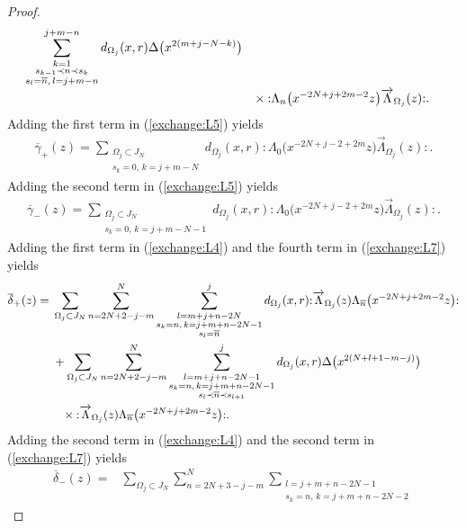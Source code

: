 \documentclass[10pt,a4paper]{amsart}
\numberwithin{equation}{section}
\begin{document}
\begin{proof}
\begin{align}
\sum\limits_{\substack{k=1\\s_{k-1}\prec n \prec s_k
\\s_l=\overline{n},\, l=j+m-n}}^{j+m-n}d_{\Omega_j}(x,r)\Delta\big(x^{2(m+j-N-k)}\big)\notag
\\[-.5ex]
&\phantom{+}\times{:}\Lambda_{n}\big(x^{-2N+j+2m-2}z\big)\overrightarrow{\Lambda}_{\Omega_j}(z){:}.
\label{def:bbeta-}
\end{align}
Adding the first term in (\ref{exchange:L5}) yields
\begin{gather}
\overline{\gamma}_+(z)=
\sum\limits_{\substack{\Omega_j \subset J_N\\s_k=0,\, k=j+m-N}}
d_{\Omega_j}(x,r){:}\Lambda_0\big(x^{-2N+j-2+2m}z\big)
\overrightarrow{\Lambda}_{\Omega_j}(z){:}.
\label{def:bgamma+}
\end{gather}
Adding the second term in (\ref{exchange:L5}) yields
\begin{gather}
\overline{\gamma}_-(z)=\sum\limits_{\substack{\Omega_j \subset J_N
\\s_k=0,\, k=j+m-N-1}}d_{\Omega_j}(x,r)
{:}\Lambda_0\big(x^{-2N+j-2+2m}z\big)\overrightarrow{\Lambda}_{\Omega_j}(z){:}.
\label{def:bgamma-}
\end{gather}
Adding the first term in (\ref{exchange:L4}) and
the fourth term in (\ref{exchange:L7}) yields
\begin{align}
\overline{{\delta}}_+(z)={}&\sum_{\Omega_j \subset J_N}\sum_{n=2N+2-j-m}^{N}
\sum\limits_{\substack{l=m+j+n-2N\\
s_k=n, \, k=j+m+n-2N-1\\ s_l=\overline{n}}}^{j}d_{\Omega_j}(x,r)
{:}\overrightarrow{\Lambda}_{\Omega_j}(z)\Lambda_{\overline{n}}\big(x^{-2N+j+2m-2}z\big){:}\notag
\\
&+\sum_{\Omega_j \subset J_N}\sum_{n=2N+2-j-m}^{N}
\sum\limits_{\substack{l=m+j+n-2N-1\\s_k=n,\, k=j+m+n-2N-1
\\s_l\prec \overline{n} \prec s_{l+1}}}^{j}
d_{\Omega_j}(x,r)\Delta\big(x^{2(N+l+1-m-j)}\big)\notag
\\
&\phantom{+}\times{:}\overrightarrow{\Lambda}_{\Omega_j}(z)
\Lambda_{\overline{n}}\big(x^{-2N+j+2m-2}z\big){:}.
\label{def:bdelta+}
\end{align}
Adding the second term in (\ref{exchange:L4}) and
the second term in (\ref{exchange:L7}) yields
\begin{align}
\overline{\delta}_-(z)={}&
\sum_{\Omega_j \subset J_N}\sum_{n=2N+3-j-m}^{N}
\sum\limits_{\substack{l=j+m+n-2N-1\\s_k=n,\, k=j+m+n-2N-2
}}
\end{align}
\end{proof}
\end{document}
